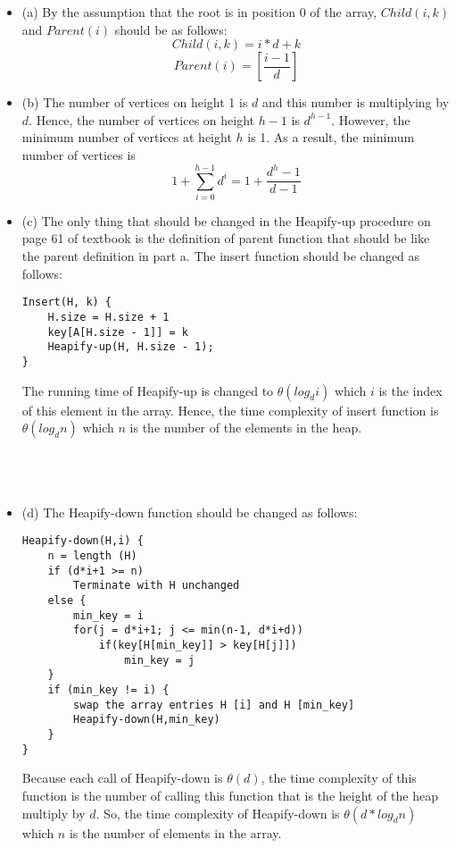 \documentclass[12pt]{article}
\newenvironment{solution}[2][Solution]{\begin{trivlist}
\item[\hskip \labelsep {\bfseries #1}]}{\end{trivlist}}
\begin{document}
\begin{solution}{}
\begin{itemize}
\item (a) By the assumption that the root is in position 0 of the array, $Child(i,k)$ and
$Parent(i)$ should be as follows: $$ Child(i,k) = i*d + k $$
$$ Parent(i) = [ \frac{i-1} {d} ]$$

\item (b) The number of vertices on height 1 is $d$ and this number is multiplying
by $d$. Hence, the number of vertices on height $h-1$ is $d^{h-1}$. However, the minimum
number of vertices at height $h$ is 1. As a result, the minimum number of vertices is
$$ 1 + \sum_{i=0}^{h-1}d^i = 1 + \frac{d^h - 1}{d-1}$$

\item (c) The only thing that should be changed in the Heapify-up procedure on page 61
of textbook is the definition of parent function that should be like the parent definition in
part a. The insert function should be changed as follows:
\begin{lstlisting}
Insert(H, k) {
	H.size = H.size + 1
	key[A[H.size - 1]] = k
	Heapify-up(H, H.size - 1);
}
\end{lstlisting}
The running time of Heapify-up is changed to $\theta(log_d i)$ which $i$ is the index of this 
element in the array. Hence, the time complexity of insert function is $\theta(log_d n)$ which
$n$ is the number of the elements in the heap.
\bigskip
\\
\\
\\
\\
\item (d) The Heapify-down function should be changed as follows:
\begin{lstlisting}
Heapify-down(H,i) {
	n = length (H)
	if (d*i+1 >= n)
		Terminate with H unchanged
	else {
		min_key = i
		for(j = d*i+1; j <= min(n-1, d*i+d))
			if(key[H[min_key]] > key[H[j]])
				min_key = j
	}
	if (min_key != i) {
		swap the array entries H [i] and H [min_key]
		Heapify-down(H,min_key)
	}
}
\end{lstlisting}
Because each call of Heapify-down is $\theta(d)$, the time complexity of this function
is the number of calling this function that is the height of the heap multiply by $d$.
So, the time complexity of Heapify-down is $\theta(d*log_d n)$ which $n$ is the number of
elements in the array.
\end{itemize}


\end{solution}
\end{document}
